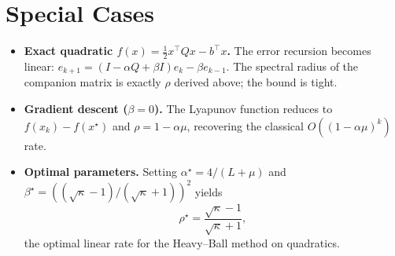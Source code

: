 \documentclass{article}
\begin{document}
\section*{Special Cases}
\begin{itemize}
\item \textbf{Exact quadratic $f(x)=\tfrac12 x^{\top}Qx-b^{\top}x$.}  
The error recursion becomes linear: $e_{k+1}= (I-\alpha Q+\beta I)e_k-\beta e_{k-1}$. The spectral radius of the companion matrix is exactly $\rho$ derived above; the bound is tight.
\item \textbf{Gradient descent ($\beta=0$).}  
The Lyapunov function reduces to $f(x_k)-f(x^{\star})$ and $\rho=1-\alpha\mu$, recovering the classical $O((1-\alpha\mu)^k)$ rate.
\item \textbf{Optimal parameters.}  
Setting $\alpha^{\star}=4/(L+\mu)$ and $\beta^{\star}=((\sqrt{\kappa}-1)/(\sqrt{\kappa}+1))^{2}$ yields
\[
\rho^{\star}= \frac{\sqrt{\kappa}-1}{\sqrt{\kappa}+1},
\]
the optimal linear rate for the Heavy–Ball method on quadratics.
\end{itemize}
\end{document}
